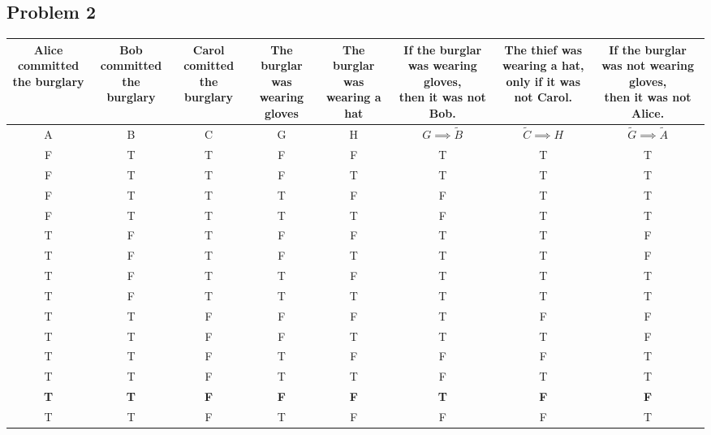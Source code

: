 \documentclass{article}
\begin{document}
\begin{landscape}
    \section*{Problem 2}
    \footnotesize
    \begin{tabular}{|c|c|c|c|c|c|c|c|}
        \hline
        \makecell{Alice committed\\the burglary} &
        \makecell{Bob committed\\the burglary} &
        \makecell{Carol comitted\\the burglary} &
        \makecell{The burglar was\\wearing gloves} &
        \makecell{The burglar was\\wearing a hat} &
        \makecell{If the burglar was wearing gloves,\\ then it was not Bob.} &
        \makecell{The thief was wearing a hat,\\ only if it was not Carol.} &
        \makecell{If the burglar was not wearing gloves,\\ then it was not Alice.} \\
        \hline
        A & B & C & G & H & \(G \implies \tilde{B}\) & \(\tilde{C} \implies H\) & \(\tilde{G} \implies \tilde{A}\) \\
        \hline
        F & T & T & F & F & T & T & T \\
        F & T & T & F & T & T & T & T \\
        F & T & T & T & F & F & T & T \\
        F & T & T & T & T & F & T & T \\
        T & F & T & F & F & T & T & F \\
        T & F & T & F & T & T & T & F \\
        T & F & T & T & F & T & T & T \\
        T & F & T & T & T & T & T & T \\
        T & T & F & F & F & T & F & F \\
        T & T & F & F & T & T & T & F \\
        T & T & F & T & F & F & F & T \\
        T & T & F & T & T & F & T & T \\
        \hline
        \textbf{T} & \textbf{T} & \textbf{F} & \textbf{F} & \textbf{F} & \textbf{T} & \textbf{F} & \textbf{F} \\
        T & T & F & T & F & F & F & T \\
        \hline
    \end{tabular}\\
    \normalsize

\end{landscape}
\end{document}
